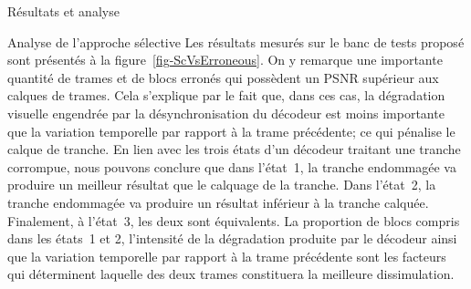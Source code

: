 \documentclass[letterpaper, twoside, 12pt,memoire]{thETS}
\newcommand{\fig}[1]{figure~\ref{#1}}
\begin{document}
\begin{chapter}{Résultats et analyse}
\begin{section}{Analyse de l'approche sélective}
Les résultats mesurés sur le banc de tests proposé sont présentés à la
\fig{fig-ScVsErroneous}. On y remarque une importante quantité de trames et de
blocs erronés qui possèdent un PSNR supérieur aux calques de trames. Cela
s'explique par le fait que, dans ces cas, la dégradation visuelle engendrée par
la désynchronisation du décodeur est moins importante que la variation
temporelle par rapport à la trame précédente; ce qui pénalise
 le calque de tranche. En lien avec les trois états d'un décodeur
traitant une tranche corrompue, nous pouvons conclure que dans l'état~1, la
tranche endommagée va produire un meilleur résultat que le calquage de la
tranche. Dans l'état~2, la tranche endommagée va produire un résultat inférieur
à la tranche calquée. Finalement, à l'état~3, les deux sont équivalents. La
proportion de blocs compris dans les états~1 et 2, l'intensité de la dégradation
produite par le décodeur ainsi que la variation temporelle par rapport à la
trame précédente sont les facteurs qui déterminent laquelle des deux trames
constituera la meilleure dissimulation.


\end{section}
\end{chapter}
\end{document}
